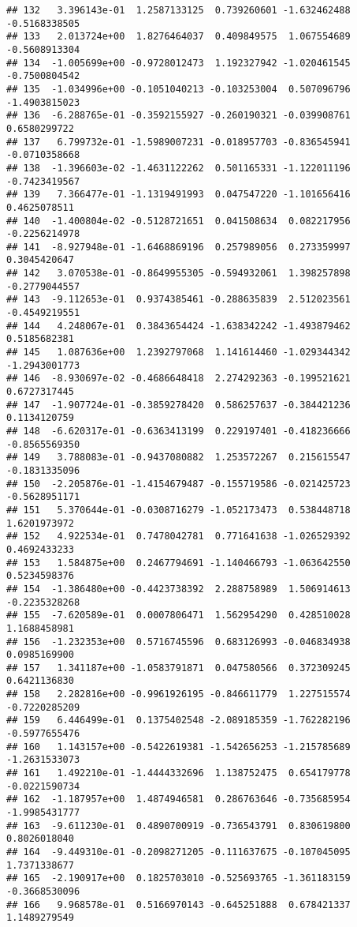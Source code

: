 \documentclass[
]{article}
\begin{document}
\begin{verbatim}
## 132   3.396143e-01  1.2587133125  0.739260601 -1.632462488 -0.5168338505
## 133   2.013724e+00  1.8276464037  0.409849575  1.067554689 -0.5608913304
## 134  -1.005699e+00 -0.9728012473  1.192327942 -1.020461545 -0.7500804542
## 135  -1.034996e+00 -0.1051040213 -0.103253004  0.507096796 -1.4903815023
## 136  -6.288765e-01 -0.3592155927 -0.260190321 -0.039908761  0.6580299722
## 137   6.799732e-01 -1.5989007231 -0.018957703 -0.836545941 -0.0710358668
## 138  -1.396603e-02 -1.4631122262  0.501165331 -1.122011196 -0.7423419567
## 139   7.366477e-01 -1.1319491993  0.047547220 -1.101656416  0.4625078511
## 140  -1.400804e-02 -0.5128721651  0.041508634  0.082217956 -0.2256214978
## 141  -8.927948e-01 -1.6468869196  0.257989056  0.273359997  0.3045420647
## 142   3.070538e-01 -0.8649955305 -0.594932061  1.398257898 -0.2779044557
## 143  -9.112653e-01  0.9374385461 -0.288635839  2.512023561 -0.4549219551
## 144   4.248067e-01  0.3843654424 -1.638342242 -1.493879462  0.5185682381
## 145   1.087636e+00  1.2392797068  1.141614460 -1.029344342 -1.2943001773
## 146  -8.930697e-02 -0.4686648418  2.274292363 -0.199521621  0.6727317445
## 147  -1.907724e-01 -0.3859278420  0.586257637 -0.384421236  0.1134120759
## 148  -6.620317e-01 -0.6363413199  0.229197401 -0.418236666 -0.8565569350
## 149   3.788083e-01 -0.9437080882  1.253572267  0.215615547 -0.1831335096
## 150  -2.205876e-01 -1.4154679487 -0.155719586 -0.021425723 -0.5628951171
## 151   5.370644e-01 -0.0308716279 -1.052173473  0.538448718  1.6201973972
## 152   4.922534e-01  0.7478042781  0.771641638 -1.026529392  0.4692433233
## 153   1.584875e+00  0.2467794691 -1.140466793 -1.063642550  0.5234598376
## 154  -1.386480e+00 -0.4423738392  2.288758989  1.506914613 -0.2235328268
## 155  -7.620589e-01  0.0007806471  1.562954290  0.428510028  1.1688458981
## 156  -1.232353e+00  0.5716745596  0.683126993 -0.046834938  0.0985169900
## 157   1.341187e+00 -1.0583791871  0.047580566  0.372309245  0.6421136830
## 158   2.282816e+00 -0.9961926195 -0.846611779  1.227515574 -0.7220285209
## 159   6.446499e-01  0.1375402548 -2.089185359 -1.762282196 -0.5977655476
## 160   1.143157e+00 -0.5422619381 -1.542656253 -1.215785689 -1.2631533073
## 161   1.492210e-01 -1.4444332696  1.138752475  0.654179778 -0.0221590734
## 162  -1.187957e+00  1.4874946581  0.286763646 -0.735685954 -1.9985431777
## 163  -9.611230e-01  0.4890700919 -0.736543791  0.830619800  0.8026018040
## 164  -9.449310e-01 -0.2098271205 -0.111637675 -0.107045095  1.7371338677
## 165  -2.190917e+00  0.1825703010 -0.525693765 -1.361183159 -0.3668530096
## 166   9.968578e-01  0.5166970143 -0.645251888  0.678421337  1.1489279549

\end{verbatim}
\end{document}
